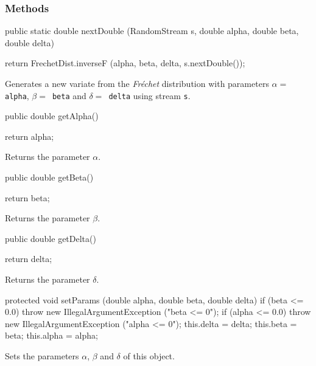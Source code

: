 \subsubsection* {Methods}
\begin{code}

   public static double nextDouble (RandomStream s, double alpha,
                                    double beta, double delta)\begin{hide} {
      return FrechetDist.inverseF (alpha, beta, delta, s.nextDouble());
   }\end{hide}
\end{code}
\begin{tabb}
   Generates a new variate from the \emph{Fr\'echet} distribution with parameters
$\alpha =$ \texttt{alpha},   $\beta = $~\texttt{beta} and $\delta =
 $~\texttt{delta} using stream \texttt{s}.
\end{tabb}
\begin{code}

   public double getAlpha()\begin{hide} {
      return alpha;
   }\end{hide}
\end{code}
  \begin{tabb} Returns the parameter $\alpha$.
  \end{tabb}
\begin{code}

   public double getBeta()\begin{hide} {
      return beta;
   }\end{hide}
\end{code}
  \begin{tabb} Returns the parameter $\beta$.
  \end{tabb}
\begin{code}

   public double getDelta()\begin{hide} {
      return delta;
   }\end{hide}
\end{code}
  \begin{tabb} Returns the parameter $\delta$.
  \end{tabb}
\begin{hide}\begin{code}

   protected void setParams (double alpha, double beta, double delta) {
     if (beta <= 0.0)
         throw new IllegalArgumentException ("beta <= 0");
      if (alpha <= 0.0)
         throw new IllegalArgumentException ("alpha <= 0");
      this.delta = delta;
      this.beta = beta;
      this.alpha = alpha;
   }
\end{code}
\begin{tabb}
   Sets the parameters  $\alpha$, $\beta$  and $\delta$ of this object.
\end{tabb}
\begin{code}
}
\end{code}
\end{hide}
